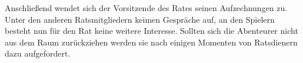 
Anschließend wendet sich der Vorsitzende des Rates seinen Aufzechnungen zu. Unter den anderen Ratsmitgliedern keimen Gespräche auf, an den Spielern besteht nun für den Rat keine weitere Interesse. Sollten sich die Abenteurer nicht aus dem Raum zurückziehen werden sie nach einigen Momenten von Ratsdienern dazu aufgefordert.
